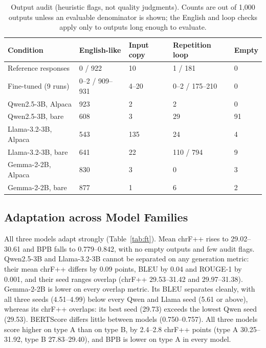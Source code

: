 \documentclass{article}
\begin{document}
\begin{table}[tbp]
\centering
\fontsize{8.5}{10}\selectfont
\setlength{\tabcolsep}{3pt}
\caption{Output audit (heuristic flags, not quality judgments). Counts are out of 1,000 outputs unless an evaluable denominator is shown; the English and loop checks apply only to outputs long enough to evaluate.}\label{tab:audit}
\begin{tabular}{@{}L{144.3pt}R{94.3pt}R{52.4pt}R{96.4pt}R{52.4pt}@{}}
\toprule
\textbf{Condition} & \textbf{English-like} & \textbf{Input copy} & \textbf{Repetition loop} & \textbf{Empty} \\
\midrule
Reference responses & 0 / 922 & 10 & 1 / 181 & 0 \\
Fine-tuned (9 runs) & 0–2 / 909–931 & 4–20 & 0–2 / 175–210 & 0 \\
Qwen2.5-3B, Alpaca & 923 & 2 & 2 & 0 \\
Qwen2.5-3B, bare & 608 & 3 & 29 & 91 \\
Llama-3.2-3B, Alpaca & 543 & 135 & 24 & 4 \\
Llama-3.2-3B, bare & 641 & 22 & 110 / 794 & 9 \\
Gemma-2-2B, Alpaca & 830 & 3 & 0 & 3 \\
Gemma-2-2B, bare & 877 & 1 & 6 & 2 \\
\bottomrule
\end{tabular}
\end{table}

\subsection{Adaptation across Model Families}\label{sec:res-adapt}

All three models adapt strongly (Table~\ref{tab:ft}). Mean chrF++ rises to 29.02–30.61 and BPB falls to 0.779–0.842, with no empty outputs and few audit flags. Qwen2.5-3B and Llama-3.2-3B cannot be separated on any generation metric: their mean chrF++ differs by 0.09 points, BLEU by 0.04 and ROUGE-1 by 0.001, and their seed ranges overlap (chrF++ 29.53–31.42 and 29.97–31.38). Gemma-2-2B is lower on every overlap metric. Its BLEU separates cleanly, with all three seeds (4.51–4.99) below every Qwen and Llama seed (5.61 or above), whereas its chrF++ overlaps: its best seed (29.73) exceeds the lowest Qwen seed (29.53). BERTScore differs little between models (0.750–0.757). All three models score higher on type A than on type B, by 2.4–2.8 chrF++ points (type A 30.25–31.92, type B 27.83–29.40), and BPB is lower on type A in every model.
\end{document}
